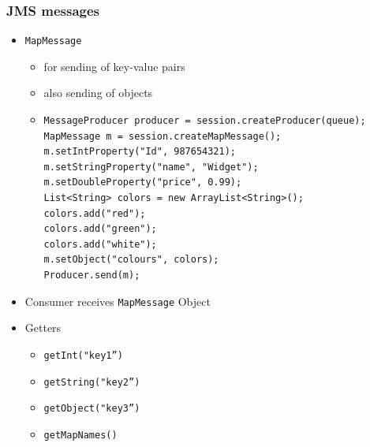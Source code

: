 \documentclass[10pt,xcolor=pdflatex]{beamer}
\begin{document}
\begin{frame}[containsverbatim]\frametitle{JMS messages}
\begin{itemize}
  \item \texttt{MapMessage}
	\begin{itemize}
	  \item for sending of key-value pairs
	  \item also sending of objects
      \item[] \vspace*{0.1cm} \begin{footnotesize}
 \begin{verbatim}
MessageProducer producer = session.createProducer(queue);
MapMessage m = session.createMapMessage();
m.setIntProperty("Id", 987654321);
m.setStringProperty("name", "Widget");
m.setDoubleProperty("price", 0.99);
List<String> colors = new ArrayList<String>();
colors.add("red");
colors.add("green");
colors.add("white");
m.setObject("colours", colors);
Producer.send(m);
\end{verbatim}\end{footnotesize}
    \end{itemize}
  \item Consumer receives \texttt{MapMessage} Object
  \item Getters
    \begin{itemize}
      \item \texttt{getInt("key1”)}
	  \item \texttt{getString("key2”)}
	  \item \texttt{getObject("key3”)}
	  \item \texttt{getMapNames()}
    \end{itemize}
\end{itemize}
\end{frame}
\end{document}
